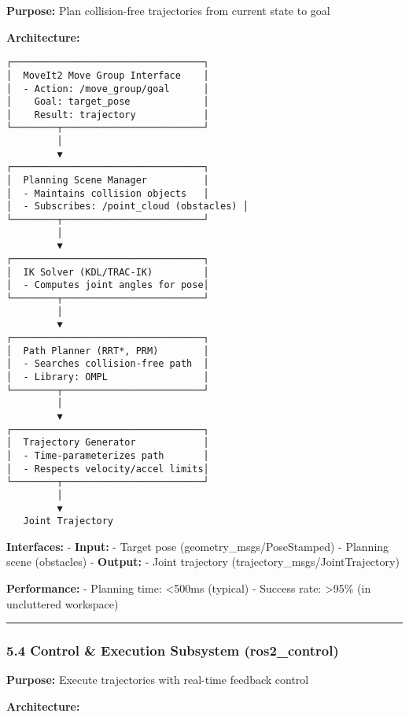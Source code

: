\documentclass[
]{article}
\begin{document}
\textbf{Purpose:} Plan collision-free trajectories from current state to
goal

\textbf{Architecture:}

\begin{verbatim}
┌──────────────────────────────────┐
│  MoveIt2 Move Group Interface    │
│  - Action: /move_group/goal      │
│    Goal: target_pose             │
│    Result: trajectory            │
└────────┬─────────────────────────┘
         │
         ▼
┌──────────────────────────────────┐
│  Planning Scene Manager          │
│  - Maintains collision objects   │
│  - Subscribes: /point_cloud (obstacles) │
└────────┬─────────────────────────┘
         │
         ▼
┌──────────────────────────────────┐
│  IK Solver (KDL/TRAC-IK)         │
│  - Computes joint angles for pose│
└────────┬─────────────────────────┘
         │
         ▼
┌──────────────────────────────────┐
│  Path Planner (RRT*, PRM)        │
│  - Searches collision-free path  │
│  - Library: OMPL                 │
└────────┬─────────────────────────┘
         │
         ▼
┌──────────────────────────────────┐
│  Trajectory Generator            │
│  - Time-parameterizes path       │
│  - Respects velocity/accel limits│
└────────┬─────────────────────────┘
         │
         ▼
   Joint Trajectory
\end{verbatim}

\textbf{Interfaces:} - \textbf{Input:} - Target pose
(geometry\_msgs/PoseStamped) - Planning scene (obstacles) -
\textbf{Output:} - Joint trajectory (trajectory\_msgs/JointTrajectory)

\textbf{Performance:} - Planning time: \textless500ms (typical) -
Success rate: \textgreater95\% (in uncluttered workspace)

\begin{center}\rule{0.5\linewidth}{0.5pt}\end{center}

\hypertarget{control-execution-subsystem-ros2_control}{%
\subsubsection{5.4 Control \& Execution Subsystem
(ros2\_control)}\label{control-execution-subsystem-ros2_control}}

\textbf{Purpose:} Execute trajectories with real-time feedback control

\textbf{Architecture:}
\end{document}
